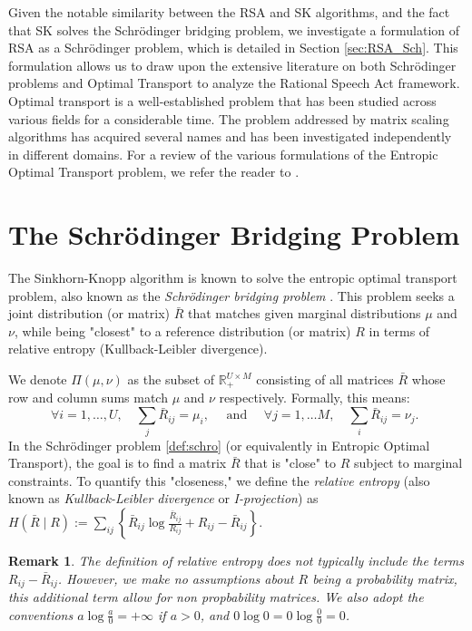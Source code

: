 \documentclass{article}
\newtheorem{remark}{Remark}[section] %
\begin{document}
 Given the notable similarity between the RSA and SK algorithms, and the fact that SK solves the Schrödinger bridging problem, we investigate a formulation of RSA as a Schrödinger problem, which is detailed in Section \ref*{sec:RSA_Sch}. This formulation allows us to draw upon the extensive literature on both Schrödinger problems and Optimal Transport to analyze the Rational Speech Act framework. Optimal transport is a well-established problem that has been studied across various fields for a considerable time. The problem addressed by matrix scaling algorithms has acquired several names and has been investigated independently in different domains. For a review of the various formulations of the Entropic Optimal Transport problem, we refer the reader to \cite{idel2016reviewmatrixscalingsinkhorns}.

\section{The Schrödinger Bridging Problem}
The Sinkhorn-Knopp algorithm is known to solve the entropic optimal transport problem, also known as the \textit{Schrödinger bridging problem} \cite{léonard2013surveyschrodingerproblemconnections, gushchin2023buildingbridgeschrodingercontinuous}. This problem seeks a joint distribution (or matrix) $\bar{R}$ that matches given marginal distributions $\mu$ and $\nu$, while being "closest" to a reference distribution (or matrix) $R$ in terms of relative entropy (Kullback-Leibler divergence).

We denote $\Pi(\mu, \nu)$ as the subset of $\mathbb{R}^{U \times M}_{+}$ consisting of all matrices $\bar{R}$ whose row and column sums match $\mu$ and $\nu$ respectively. Formally, this means:
$$
\forall i=1, \ldots, U, \quad \sum_j \bar{R}_{i j}=\mu_i, \quad \text { and } \quad \forall j=1, \ldots M, \quad \sum_i \bar{R}_{i j}=\nu_j \text {. }
$$
In the Schrödinger problem \ref{def:schro} (or equivalently in Entropic Optimal Transport), the goal is to find a matrix $\bar R$ that is "close" to $R$ subject to marginal constraints. To quantify this "closeness," we define the \textit{relative entropy} (also known as \textit{Kullback-Leibler divergence} or \textit{I-projection}) as $
H(\bar{R} \mid R):=\sum_{i j}\left\{\bar{R}_{i j} \log \frac{\bar{R}_{i j}}{R_{i j}}+R_{i j}-\bar{R}_{i j}\right\}
$.

\begin{remark}
    The definition of relative entropy does not typically include the terms $R_{ij}-\bar{R}_{ij}$. However, we make no assumptions about $R$ being a probability matrix, this additional term allow for non propbability matrices. We also adopt the conventions $a \log \frac{a}{0}=+\infty$ if $a>0$, and $0 \log 0=0 \log \frac{0}{0}=0$.
\end{remark}
\end{document}

